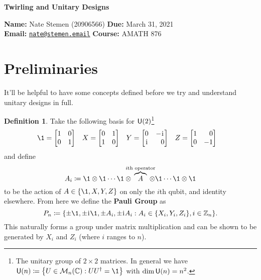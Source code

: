 \documentclass[11pt,english]{article}
\theoremstyle{definition}
\newtheorem{definition}{Definition}[section]
\begin{document}
\thispagestyle{plain}
\begin{center}
  \textsf{\textbf{\LARGE Twirling and Unitary Designs}}
\end{center}
\textbf{Name:} Nate Stemen (20906566) \hspace{\fill} \textbf{Due:} March 31, 2021 \\
\textbf{Email:} \href{mailto:nate@stemen.email}{\texttt{nate@stemen.email}} \hspace{\fill} \textbf{Course:} \textsc{AMATH} 876


\begingroup
{}
\hypersetup{linkcolor=darkblue}
\tableofcontents
\endgroup

\vspace{0.5cm}

\section{Preliminaries}
It'll be helpful to have some concepts defined before we try and understand unitary designs in full.

\begin{definition}
  Take the following basis for $\mathsf{U}(2)$\footnote{The unitary group of $2\times 2$ matrices. In general we have $\U{n}\defeq \qty{U\in\mats{n}{\C} : UU^\dagger = \1}$ with $\dim\mathsf{U}(n) = n^2$.}
  \begin{align}
    \1 & = \mqty[1 & 0 \\ 0 & 1] & X & = \mqty[0 & 1 \\ 1 & 0] & Y & = \mqty[0 & -\iu \\ \iu & \phantom{-}0] & Z & = \mqty[1 & \phantom{-}0 \\ 0 & -1]
  \end{align}
  and define
  \begin{equation}
    A_i\defeq \1\otimes \1 \cdots \1 \otimes \!\!\!\!\!\!\overbrace{A}^{i\text{th operator}}\!\!\!\!\!\! \otimes \1 \cdots \1 \otimes \1
  \end{equation}
  to be the action of $A\in \qty{\1, X, Y, Z}$ on only the $i$th qubit, and identity elsewhere. From here we define the \textbf{Pauli Group} as
  \begin{equation}
    P_n\defeq \qty{\pm\1, \pm\iu\1, \pm A_i, \pm\iu A_i : A_i\in\qty{X_i, Y_i, Z_i}, i\in\Z_n}.
  \end{equation}
  This naturally forms a group under matrix multiplication and can be shown to be generated by $X_i$ and $Z_i$ (where $i$ ranges to $n$).
\end{definition}
\end{document}
